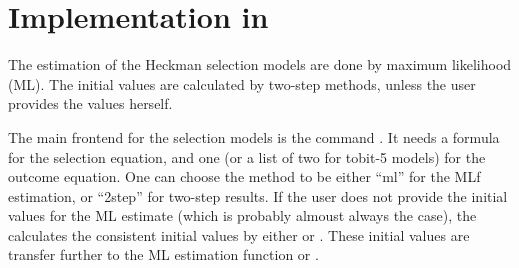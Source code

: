 
\section[Implementation]{Implementation in }

The estimation of the Heckman selection models are done by maximum
likelihood (ML).  The initial values are calculated by two-step methods,
unless the user provides the values herself.  

The main frontend for the selection models is the command
.  It needs a formula for the selection equation, and
one (or a list of two for tobit-5 models) for the outcome equation.
One can choose the method to be either ``ml'' for the MLf estimation,
or ``2step'' for two-step results.  If the user does not provide the
initial values for the ML estimate (which is probably almoust always
the case), the  calculates the consistent initial
values by either  or .  These initial
values are transfer further to the ML estimation function
 or .
